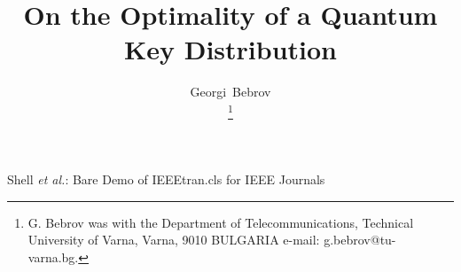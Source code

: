 \documentclass[journal,onecolumn]{IEEEtran}
\theoremstyle{thmstyleone}%
\theoremstyle{thmstyletwo}%
\theoremstyle{thmstylethree}%
\begin{document}
		\title{On the Optimality of a Quantum Key Distribution}
		
		\author{Georgi~Bebrov
			
			\thanks{G. Bebrov was with the Department
				of Telecommunications, Technical University of Varna, Varna, 9010 BULGARIA e-mail: g.bebrov@tu-varna.bg.}%
			}
		
	
	
	
	{Shell \MakeLowercase{\textit{et al.}}: Bare Demo of IEEEtran.cls for IEEE Journals}
	
\end{document}
